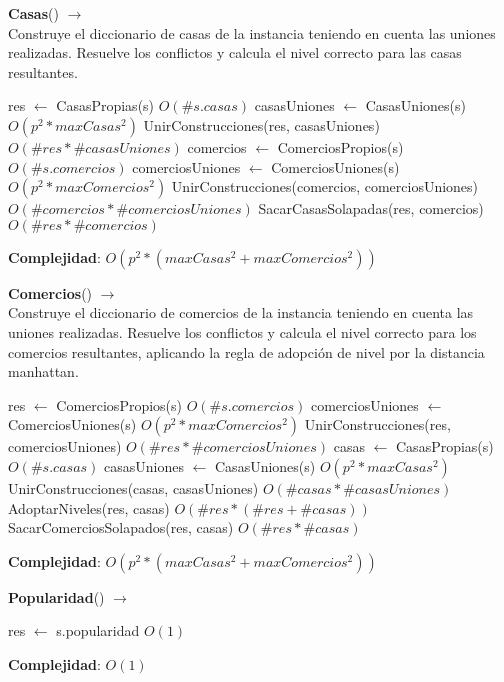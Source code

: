 \begin{Algoritmos}
\begin{algorithm}[H]{\textbf{Casas}() $\to$ }
\\ {\small Construye el diccionario de casas de la instancia teniendo en cuenta las uniones realizadas. Resuelve los conflictos y calcula el nivel correcto para las casas resultantes.}
\begin{algorithmic}[1]
    \State res $\gets$ CasasPropias(s) \Comment $O(\#s.casas)$
    \State casasUniones $\gets$ CasasUniones(s) \Comment $O(p^2 * maxCasas^2)$
    \State UnirConstrucciones(res, casasUniones) \Comment $O(\#res * \#casasUniones)$
    \State comercios $\gets$ ComerciosPropios(s) \Comment $O(\#s.comercios)$
    \State comerciosUniones $\gets$ ComerciosUniones(s) \Comment $O(p^2 * maxComercios^2)$
    \State UnirConstrucciones(comercios, comerciosUniones) \Comment $O(\#comercios * \#comerciosUniones)$
    \State SacarCasasSolapadas(res, comercios) \Comment $O(\#res * \#comercios)$
\end{algorithmic}
\textbf{Complejidad}: $O(p^2 * (maxCasas^2 + maxComercios^2))$
\end{algorithm}

\begin{algorithm}[H]{\textbf{Comercios}() $\to$ }
\\ {\small Construye el diccionario de comercios de la instancia teniendo en cuenta las uniones realizadas. Resuelve los conflictos y calcula el nivel correcto para los comercios resultantes, aplicando la regla de adopción de nivel por la distancia manhattan.}
\begin{algorithmic}[1]
    \State res $\gets$ ComerciosPropios(s) \Comment $O(\#s.comercios)$
    \State comerciosUniones $\gets$ ComerciosUniones(s) \Comment $O(p^2 * maxComercios^2)$
    \State UnirConstrucciones(res, comerciosUniones) \Comment $O(\#res * \#comerciosUniones)$
    \State casas $\gets$ CasasPropias(s) \Comment $O(\#s.casas)$
    \State casasUniones $\gets$ CasasUniones(s) \Comment $O(p^2 * maxCasas^2)$
    \State UnirConstrucciones(casas, casasUniones) \Comment $O(\#casas * \#casasUniones)$
    \State AdoptarNiveles(res, casas) \Comment $O(\#res * (\#res + \#casas))$
    \State SacarComerciosSolapados(res, casas) \Comment $O(\#res * \#casas)$
\end{algorithmic}
\textbf{Complejidad}: $O(p^2 * (maxCasas^2 + maxComercios^2))$
\end{algorithm}

\begin{algorithm}[H]{\textbf{Popularidad}() $\to$ }
\begin{algorithmic}[1]
    \State res $\gets$ s.popularidad \Comment $O(1)$
\end{algorithmic}
\textbf{Complejidad}: $O(1)$
\end{algorithm}


\end{Algoritmos}
